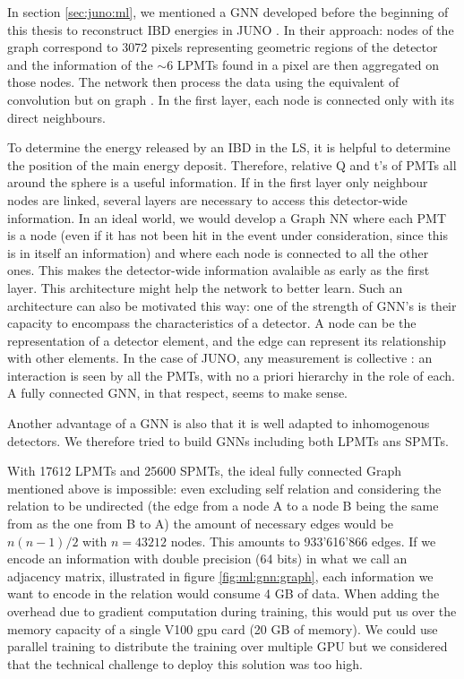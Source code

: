 \documentclass[../main.tex]{subfiles}
\begin{document}
In section \ref{sec:juno:ml}, we mentioned a GNN developed before the beginning of this thesis to reconstruct IBD energies in JUNO \cite{qian_vertex_2021}. In their approach:
nodes of the graph correspond to 3072 pixels representing geometric regions of the detector and the information of the $\sim6$ LPMTs found in a pixel are then aggregated on those nodes.
The network then process the data using the equivalent of convolution but on graph \cite{defferrard_convolutional_2017}. In the first layer, each node is connected only with its direct neighbours.

To determine the energy released by an IBD in the LS, it is helpful to determine the position of the main energy deposit. Therefore, relative Q and t's of PMTs all around the sphere is a useful information. If in the first layer only neighbour nodes are linked, several layers are necessary to access this detector-wide information. In an ideal world, we would develop a Graph NN where each PMT is a node
(even if it has not been hit in the event under consideration, since this is in itself an information) and where each node is connected to all the other ones. This makes the detector-wide information avalaible as early as the first layer. This architecture
might help the network to better learn. Such an architecture can also be motivated this way: one of the strength of GNN's is their capacity to encompass the characteristics of a detector.
A node can be the representation of a detector element, and the edge can represent its relationship with other elements. In the case of JUNO, any measurement is collective : an interaction is seen by all the PMTs, with no a priori hierarchy in the role of each.
A fully connected GNN, in that respect, seems to make sense.

Another advantage of a GNN is also that it is well adapted to inhomogenous detectors.
We therefore tried to build GNNs including both LPMTs ans SPMTs.

With 17612 LPMTs and 25600 SPMTs, the ideal fully connected Graph mentioned above is impossible: even excluding self relation and considering the relation to be undirected (the edge from a node A to a node B being the same from
as the one from B to A) the amount of necessary edges would be $n(n-1)/2$ with $n = 43212$
nodes. This amounts to 933'616'866 edges. If we encode an information with double precision (64 bits) in what we call an adjacency matrix, illustrated in figure \ref{fig:ml:gnn:graph}, each information we want to encode in the relation would consume 4 GB of data. When adding the overhead due to gradient computation during training, this would put us over the memory capacity of a single V100 gpu card (20 GB of memory).
We could use parallel training to distribute the training over multiple GPU but we considered that the technical challenge to deploy this solution was too high.
\end{document}

